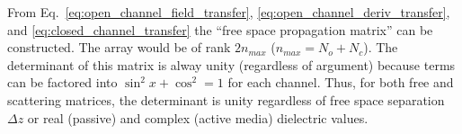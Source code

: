 From Eq.~\ref{eq:open_channel_field_transfer}, \ref{eq:open_channel_deriv_transfer}, and \ref{eq:closed_channel_transfer} the ``free space propagation matrix'' can be constructed. The array would be of rank $2 n_{max}$ ($n_{max}=N_o+N_c$). The determinant of this matrix is alway unity (regardless of argument) because terms can be factored into $\sin^2x +\cos^2=1$ for each channel. Thus, for both free and scattering matrices, the determinant is unity regardless of free space separation $\Delta z$ or real (passive) and complex (active media) dielectric values.

\begin{comment}
\begin{equation}
\left( \begin{array}{cccccccc}
\cos(k_{\parallel 1}\Delta z)   & 0 & 0 & 0 & \sin(k_{\parallel 1}\Delta z)   & 0 & 0 & 0 \\
0 & \cos(k_{\parallel N_0}\Delta z) & 0 & 0 & 0 & \sin(k_{\parallel N_0}\Delta z) & 0 & 0 \\

0 & 0 & \cosh(k_{\parallel N_0+1}\Delta z)   & 0 & 0 & 0 & \sinh(k_{\parallel n}\Delta z) & 0  \\
0 & 0 & 0 & \cosh(k_{\parallel n_{max}}\Delta z) & 0 & 0 & 0 & \sinh(k_{\parallel n}\Delta z) \\

-\sin(k_{\parallel n}\Delta z) & 0 & \cos(k_{\parallel n}\Delta z) & 0 \\
-\sin(k_{\parallel n}\Delta z) & 0 & \cos(k_{\parallel n}\Delta z) & 0 \\

0 & \sinh(k_{\parallel n}\Delta z) & 0 & \cosh(k_{\parallel n}\Delta z) \\
0 & \sinh(k_{\parallel n}\Delta z) & 0 & \cosh(k_{\parallel n}\Delta z) \\
\end{array} \right)
\end{equation}


\end{comment}
